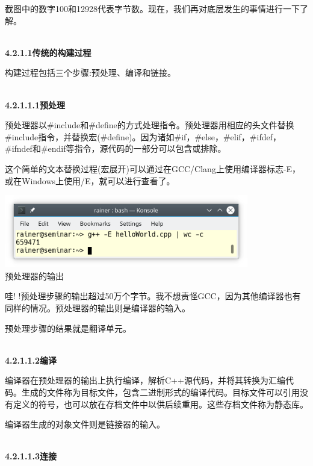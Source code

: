 截图中的数字100和12928代表字节数。现在，我们再对底层发生的事情进行一下了解。

\hspace*{\fill} \\ %
\noindent
\textbf{4.2.1.1\hspace{0.2cm}传统的构建过程}

构建过程包括三个步骤:预处理、编译和链接。

\hspace*{\fill} \\ %
\noindent
\textbf{4.2.1.1.1\hspace{0.2cm}预处理}

预处理器以\#include和\#define的方式处理指令。预处理器用相应的头文件替换\#include指令，并替换宏(\#define)。因为诸如\#if，\#else，\#elif，\#ifdef，\#ifndef和\#endif等指令，源代码的一部分可以包含或排除。

这个简单的文本替换过程(宏展开)可以通过在GCC/Clang上使用编译器标志-E，或在Windows上使用/E，就可以进行查看了。

\begin{center}
\includegraphics[width=0.8\textwidth]{content/3/chapter4/images/13.png}\\
预处理器的输出
\end{center}

哇! !预处理步骤的输出超过50万个字节。我不想责怪GCC，因为其他编译器也有同样的情况。预处理器的输出则是编译器的输入。

预处理步骤的结果就是翻译单元。

\hspace*{\fill} \\ %
\noindent
\textbf{4.2.1.1.2\hspace{0.2cm}编译}

编译器在预处理器的输出上执行编译，解析C++源代码，并将其转换为汇编代码。生成的文件称为目标文件，包含二进制形式的编译代码。目标文件可以引用没有定义的符号，也可以放在存档文件中以供后续重用。这些存档文件称为静态库。

编译器生成的对象文件则是链接器的输入。

\hspace*{\fill} \\ %
\noindent
\textbf{4.2.1.1.3\hspace{0.2cm}连接}

